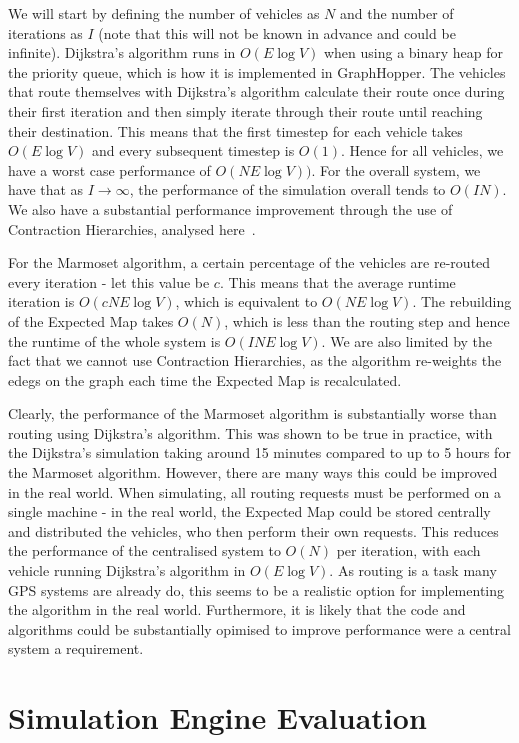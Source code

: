 \documentclass[ %
                    author={Alexander Hill},
                supervisor={Dr. Benjamin Sach},
                    degree={MEng},
                     title={MARMOSET},
                  subtitle={Multi-Agent Route Management using Online Simulation for Efficient Transportation},
                      type={research},
                      year={2016} ]{dissertation}
\begin{document}
We will start by defining the number of vehicles as $N$ and the number of
iterations as $I$ (note that this will not be known in advance and could be
infinite). Dijkstra's algorithm runs in $O(E \log V)$ when using a binary heap for the
priority queue, which is how it is implemented in GraphHopper. The vehicles that
route themselves with Dijkstra's algorithm calculate their route once during
their first iteration and then simply iterate through their route until reaching
their destination. This means that the first timestep for each vehicle takes
$O(E\log V)$ and every subsequent timestep is $O(1)$. Hence for all vehicles, we
have a worst case performance of $O(NE\log V))$. For the overall system, we
have that as $I \rightarrow \infty$, the performance of the simulation overall
tends to $O(IN)$. We also have a substantial performance improvement through the
use of Contraction Hierarchies, analysed here~\cite{ch-complexity}.

For the Marmoset algorithm, a certain percentage of the vehicles are re-routed
every iteration - let this value be $c$. This means that the average runtime
iteration is $O(cNE\log V)$, which is equivalent to $O(NE \log V)$. The
rebuilding of the Expected Map takes $O(N)$, which is less than the routing step
and hence the runtime of the whole system is $O(INE\log V)$. We are also
limited by the fact that we cannot use Contraction Hierarchies, as the algorithm
re-weights the edegs on the graph each time the Expected Map is recalculated.

Clearly, the performance of the Marmoset algorithm is substantially worse than routing
using Dijkstra's algorithm. This was shown to be true in practice, with the
Dijkstra's simulation taking around 15 minutes compared to up to 5 hours for
the Marmoset algorithm. However, there are many ways this could be improved in
the real world. When simulating, all routing requests must be performed on a
single machine - in the real world, the Expected Map could be stored centrally
and distributed the vehicles, who then perform their own requests. This reduces
the performance of the centralised system to $O(N)$ per iteration, with each
vehicle running Dijkstra's algorithm in $O(E\log V)$. As routing is a task
many GPS systems are already do, this seems to be a realistic option for
implementing the algorithm in the real world. Furthermore, it is likely that the
code and algorithms could be substantially opimised to improve performance were
a central system a requirement.

\section{Simulation Engine Evaluation}
\end{document}
